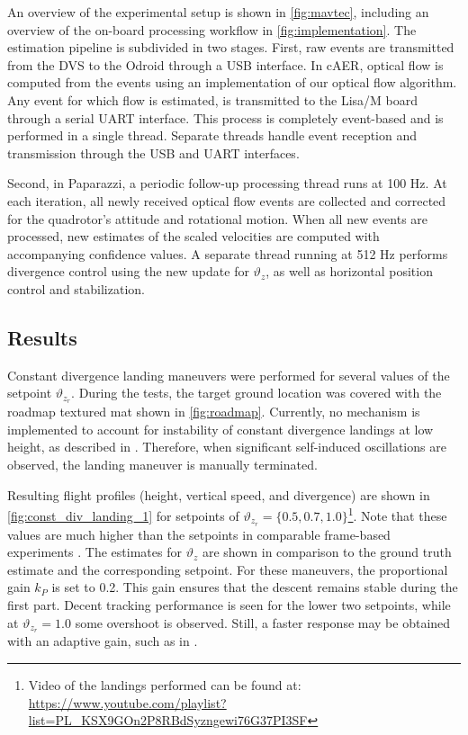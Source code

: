 An overview of the experimental setup is shown in \cref{fig:mavtec}, including an overview of the on-board processing workflow in \cref{fig:implementation}. The estimation pipeline is subdivided in two stages. First, raw events are transmitted from the DVS to the Odroid through a USB interface. In cAER, optical flow is computed from the events using an implementation of our optical flow algorithm. Any event for which flow is estimated, is transmitted to the Lisa/M board through a serial UART interface. This process is completely event-based and is performed in a single thread. Separate threads handle event reception and transmission through the USB and UART interfaces.

Second, in Paparazzi, a periodic follow-up processing thread runs at 100 Hz. At each iteration, all newly received optical flow events are collected and corrected for the quadrotor's attitude and rotational motion. When all new events are processed, new estimates of the scaled velocities are computed with accompanying confidence values. A separate thread running at 512 Hz performs divergence control using the new update for $\vartheta_z$, as well as horizontal position control and stabilization.


\subsection{Results}
\label{sec:results_div_landings}
Constant divergence landing maneuvers were performed for several values of the setpoint $\vartheta_{z_r}$. During the tests, the target ground location was covered with the roadmap textured mat shown in \cref{fig:roadmap}. Currently, no mechanism is implemented to account for instability of constant divergence landings at low height, as described in \citet{DeCroon2016}. Therefore, when significant self-induced oscillations are observed, the landing maneuver is manually terminated. 

Resulting flight profiles (height, vertical speed, and divergence) are shown in \cref{fig:const_div_landing_1} for setpoints of $\vartheta_{z_r}=\lbrace0.5, 0.7,1.0\rbrace$\footnote{Video of the landings performed can be found at: \url{https://www.youtube.com/playlist?list=PL_KSX9GOn2P8RBdSyzngewi76G37PI3SF}}. Note that these values are much higher than the setpoints in comparable frame-based experiments \cite{Herisse2012,Ho2016}. The estimates for $\vartheta_z$ are shown in comparison to the ground truth estimate and the corresponding setpoint. For these maneuvers, the proportional gain $k_P$ is set to 0.2. This gain ensures that the descent remains stable during the first part. Decent tracking performance is seen for the lower two setpoints, while at $\vartheta_{z_r}=1.0$ some overshoot is observed. Still, a faster response may be obtained with an adaptive gain, such as in \citet{Ho2016a}. 

